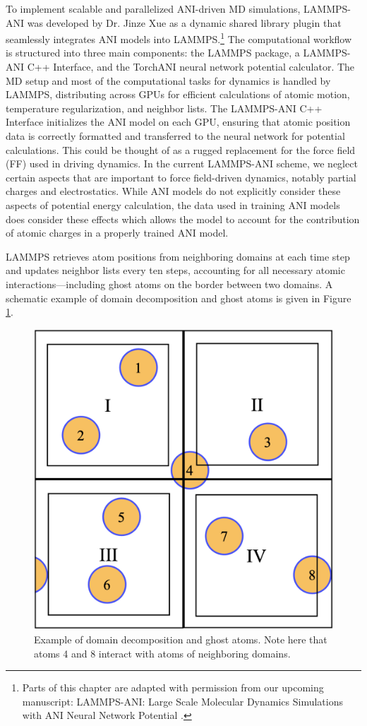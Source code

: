 To implement scalable and parallelized ANI-driven MD simulations, LAMMPS-ANI was developed by Dr. Jinze Xue \cite{lammps_ani} as a dynamic shared library plugin that seamlessly integrates ANI models into LAMMPS.\footnote{Parts of this chapter are adapted with permission from our upcoming manuscript: LAMMPS-ANI: Large Scale Molecular Dynamics Simulations with ANI Neural Network Potential \cite{lammps_ani}.}
The computational workflow is structured into three main components: the LAMMPS package, a LAMMPS-ANI C++ Interface, and the TorchANI neural network potential calculator. 
The MD setup and most of the computational tasks for dynamics is handled by LAMMPS, distributing across GPUs for efficient calculations of atomic motion, temperature regularization, and neighbor lists.
The LAMMPS-ANI C++ Interface initializes the ANI model on each GPU, ensuring that atomic position data is correctly formatted and transferred to the neural network for potential calculations.
This could be thought of as a rugged replacement for the force field (FF) used in driving dynamics.
In the current LAMMPS-ANI scheme, we neglect certain aspects that are important to force field-driven dynamics, notably partial charges and electrostatics.
While ANI models do not explicitly consider these aspects of potential energy calculation, the data used in training ANI models does consider these effects which allows the model to account for the contribution of atomic charges in a properly trained ANI model.

LAMMPS retrieves atom positions from neighboring domains at each time step and updates neighbor lists every ten steps, accounting for all necessary atomic interactions---including ghost atoms on the border between two domains.
A schematic example of domain decomposition and ghost atoms is given in Figure \ref{fig:ghost_atoms}.

\begin{figure}[!ht]
    \centering
    \includegraphics[width=.675\linewidth]{Images/ghost_atoms.png}
    \caption[Example of ghost atoms in domain decomposition]{Example of domain decomposition and ghost atoms. Note here that atoms 4 and 8 interact with atoms of neighboring domains.}
    \label{fig:ghost_atoms}
\end{figure}

